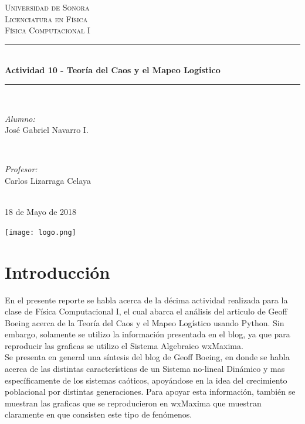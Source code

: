 \documentclass[12pt]{article}
\begin{document}
\begin{titlepage}

\newcommand{\HRule}{\rule{\linewidth}{0.5mm}} 

\center 

\textsc{\LARGE Universidad de Sonora}\\[1.5cm]
\textsc{\Large Licenciatura en Física}\\[0.5cm]
\textsc{\large Física Computacional I}\\[0.5cm]

\HRule \\[0.4cm]
{\huge \bfseries Actividad 10 - Teoría del Caos y el Mapeo Logístico}\\[0.4cm] 
\HRule \\[1.5cm]

\begin{minipage}{0.4\textwidth}
\begin{flushleft} \large
\emph{Alumno:}\\
José Gabriel Navarro I.
\end{flushleft}
\end{minipage}
~
\begin{minipage}{0.4\textwidth}
\begin{flushright} \large
\emph{Profesor:} \\
Carlos Lizarraga Celaya
\end{flushright}
\end{minipage}\\[2cm]

18 de Mayo de 2018

\texttt{[image: logo.png]}\\
 
\vfill

\end{titlepage}

\section{Introducción}
En el presente reporte se habla acerca de la décima actividad realizada para la clase de Física Computacional I, el cual abarca el análisis del articulo de Geoff Boeing acerca de la Teoría del Caos y el Mapeo Logístico usando Python. Sin embargo, solamente se utilizo la información presentada en el blog, ya que para reproducir las graficas se utilizo el Sistema Algebraico wxMaxima.  \\

Se presenta en general una síntesis del blog de Geoff Boeing, en donde se habla acerca de las distintas características de un Sistema no-lineal Dinámico y mas específicamente de los sistemas caóticos, apoyándose en la idea del crecimiento poblacional por distintas generaciones. Para apoyar esta información, también se muestran las graficas que se reproducieron en wxMaxima que muestran claramente en que consisten este tipo de fenómenos. 
\end{document}
